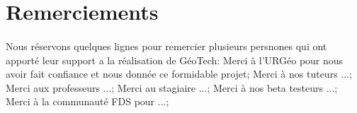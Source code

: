 \section{Remerciements}
\paragraph{}
Nous réservons quelques lignes pour remercier plusieurs persnones qui ont apporté leur support a la réalisation de GéoTech:
Merci à l'URGéo pour nous avoir fait confiance et nous donnée ce formidable projet;
Merci à nos tuteurs ...;
Merci aux professeurs ...;
Merci au stagiaire ...;
Merci à nos beta testeurs ...;
Merci à la communauté FDS pour ...;

